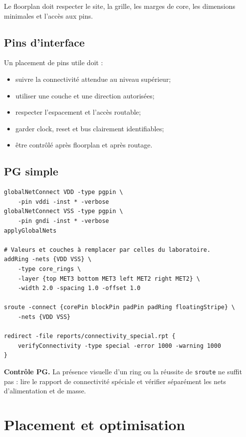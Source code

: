 \documentclass[11pt,a4paper,openany]{report}
\begin{document}
Le floorplan doit respecter le site, la grille, les marges de core, les
dimensions minimales et l'accès aux pins.

\section{Pins d'interface}

Un placement de pins utile doit :

\begin{itemize}
  \item suivre la connectivité attendue au niveau supérieur;
  \item utiliser une couche et une direction autorisées;
  \item respecter l'espacement et l'accès routable;
  \item garder clock, reset et bus clairement identifiables;
  \item être contrôlé après floorplan et après routage.
\end{itemize}

\section{PG simple}

\begin{lstlisting}[style=guidecode,language=TclGuide]
globalNetConnect VDD -type pgpin \
    -pin vddi -inst * -verbose
globalNetConnect VSS -type pgpin \
    -pin gndi -inst * -verbose
applyGlobalNets

# Valeurs et couches à remplacer par celles du laboratoire.
addRing -nets {VDD VSS} \
    -type core_rings \
    -layer {top MET3 bottom MET3 left MET2 right MET2} \
    -width 2.0 -spacing 1.0 -offset 1.0

sroute -connect {corePin blockPin padPin padRing floatingStripe} \
    -nets {VDD VSS}

redirect -file reports/connectivity_special.rpt {
    verifyConnectivity -type special -error 1000 -warning 1000
}
\end{lstlisting}

\noindent\textbf{\color{GuideOrange}Contrôle PG.}
La présence visuelle d'un ring ou la réussite de \texttt{sroute} ne suffit
pas : lire le rapport de connectivité spéciale et vérifier séparément les nets
d'alimentation et de masse.

\chapter{Placement et optimisation}
\end{document}
